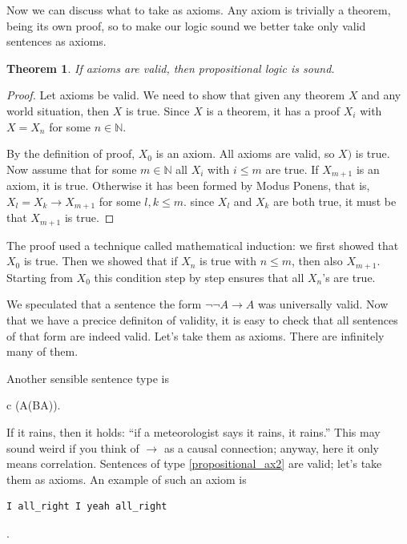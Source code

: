 \documentclass[11pt,oneside,%
]{memoir}
\newenvironment{eqna}{\begin{IEEEeqnarray}{c}}{\end{IEEEeqnarray}\ignorespacesafterend}
\newtheorem{teoreema}{Theorem}
\theoremstyle{definition}
\newcommand{\NN}{\mathbb{N}}
\begin{document}
Now we can discuss what to take as axioms. Any axiom is trivially a theorem, being its own proof, so to make our logic sound we better take only valid sentences as axioms.
\begin{teoreema}
If axioms are valid, then propositional logic is sound.
\end{teoreema}
\begin{proof}
Let axioms be valid. We need to show that given any theorem \(X\) and any world situation, then \(X\) is true. Since \(X\) is a theorem, it has a proof \(X_i\) with \(X=X_n\) for some \(n\in\NN\).

By the definition of proof, \(X_0\) is an axiom. All axioms are valid, so \(X)\) is true. Now assume that for some \(m\in\NN\) all \(X_i\) with \(i\leq m\) are true. If \(X_{m+1}\) is an axiom, it is true. Otherwise it has been formed by Modus Ponens, that is, \(X_l=X_k\rightarrow X_{m+1}\) for some \(l,k\leq m\). since \(X_l\) and \(X_k\) are both true, it must be that \(X_{m+1}\) is true.
\end{proof}
The proof used a technique called mathematical induction: we first showed that \(X_0\) is true. Then we showed that if \(X_n\) is true with \(n\leq m\), then also \(X_{m+1}\). Starting from \(X_0\) this condition step by step ensures that all \(X_n\)'s are true. %

We speculated that a sentence the form \(\neg\neg A\rightarrow A\) was universally valid. Now that we have a precice definiton of validity, it is easy to check that all sentences of that form are indeed valid. Let's take them as axioms. There are infinitely many of them.

Another sensible sentence type is
\begin{eqna}
    (A\rightarrow (B\rightarrow A)).\label{propositional_ax2}
\end{eqna}
If it rains, then it holds: ``if a meteorologist says it rains, it rains.'' This may sound weird if you think of \(\rightarrow\) as a causal connection; anyway, here it only means correlation. Sentences of type \eqref{propositional_ax2} are valid; let's take them as axioms. An example of such an axiom is
\begin{lstlisting}[language=propositio]
I all_right I yeah all_right
\end{lstlisting}
.
\end{document}
